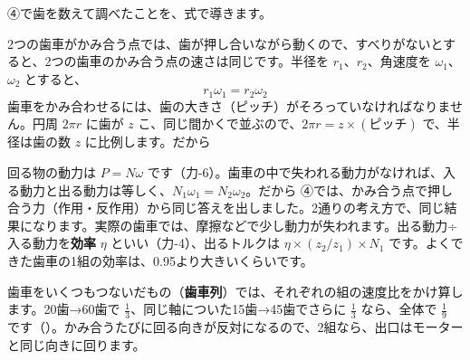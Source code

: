 \leavevmode\label{ph:力-7:sec9}④で歯を数えて調べたことを、式で導きます。

2つの歯車がかみ合う点では、歯が押し合いながら動くので、すべりがないとすると、2つの歯車のかみ合う点の速さは同じです。半径を $r_1$、$r_2$、角速度を $\omega_1$、$\omega_2$ とすると、
\[r_1\omega_1=r_2\omega_2\]
歯車をかみ合わせるには、歯の大きさ（ピッチ）がそろっていなければなりません。円周 $2\pi r$ に歯が $z$ こ、同じ間かくで並ぶので、$2\pi r=z\times(\text{ピッチ})$ で、半径は歯の数 $z$ に比例します。だから

回る物の動力は $P=N\omega$ です（力-6）。歯車の中で失われる動力がなければ、入る動力と出る動力は等しく、$N_1\omega_1=N_2\omega_2$。だから
④では、かみ合う点で押し合う力（作用・反作用）から同じ答えを出しました。2通りの考え方で、同じ結果になります。実際の歯車では、摩擦などで少し動力が失われます。出る動力÷入る動力を\textbf{効率} $\eta$ といい（力-4）、出るトルクは $\eta\times(z_2/z_1)\times N_1$ です。よくできた歯車の1組の効率は、0.95より大きいくらいです。
\begin{phflow}[歯車とベルト]
\end{phflow}
\noindent 歯車をいくつもつないだもの（\textbf{歯車列}）では、それぞれの組の速度比をかけ算します。20歯→60歯で $\tfrac{1}{3}$、同じ軸についた15歯→45歯でさらに $\tfrac{1}{3}$ なら、全体で $\tfrac{1}{9}$ です（）。かみ合うたびに回る向きが反対になるので、2組なら、出口はモーターと同じ向きに回ります。

